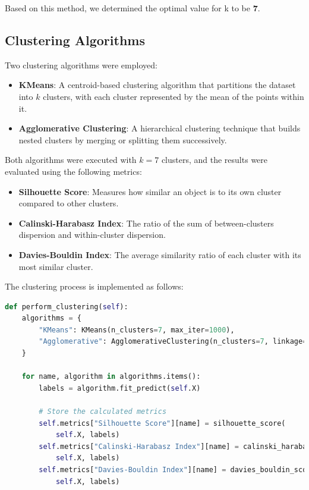 \documentclass[a4paper,11pt]{article}
\begin{document}
Based on this method, we determined the optimal value for k to be \textbf{7}.

\subsection{Clustering Algorithms}

Two clustering algorithms were employed:

\begin{itemize}
    \item \textbf{KMeans}: A centroid-based clustering algorithm that partitions the dataset into $k$ clusters, with each cluster represented by the mean of the points within it.
    \item \textbf{Agglomerative Clustering}: A hierarchical clustering technique that builds nested clusters by merging or splitting them successively.
\end{itemize}

Both algorithms were executed with $k=7$ clusters, and the results were evaluated using the following metrics:

\begin{itemize}
    \item \textbf{Silhouette Score}: Measures how similar an object is to its own cluster compared to other clusters.
    \item \textbf{Calinski-Harabasz Index}: The ratio of the sum of between-clusters dispersion and within-cluster dispersion.
    \item \textbf{Davies-Bouldin Index}: The average similarity ratio of each cluster with its most similar cluster.
\end{itemize}

The clustering process is implemented as follows:

\begin{lstlisting}[language=Python]
def perform_clustering(self):
    algorithms = {
        "KMeans": KMeans(n_clusters=7, max_iter=1000),
        "Agglomerative": AgglomerativeClustering(n_clusters=7, linkage='ward')
    }

    for name, algorithm in algorithms.items():
        labels = algorithm.fit_predict(self.X)
        
        # Store the calculated metrics
        self.metrics["Silhouette Score"][name] = silhouette_score(
            self.X, labels)
        self.metrics["Calinski-Harabasz Index"][name] = calinski_harabasz_score(
            self.X, labels)
        self.metrics["Davies-Bouldin Index"][name] = davies_bouldin_score(
            self.X, labels)
\end{lstlisting}
\end{document}
